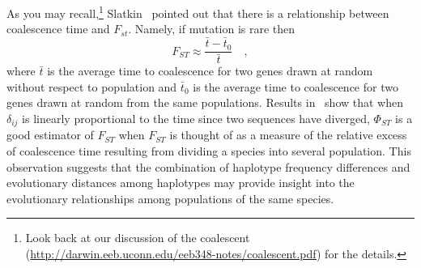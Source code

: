 \documentclass[12pt]{article}
\begin{document}
As you may recall,\footnote{Look back at our discussion of the
  coalescent
  (\url{http://darwin.eeb.uconn.edu/eeb348-notes/coalescent.pdf}) for
  the details.}  Slatkin~\cite{Slatkin91-coalescence} pointed out that
there is a relationship between coalescence time and $F_{st}$. Namely,
if mutation is rare then
\[
F_{ST} \approx \frac{\bar t - \bar t_0}{\bar t} \quad ,
\]
where $\bar t$ is the average time to coalescence for two genes drawn
at random without respect to population and $\bar t_0$ is the average
time to coalescence for two genes drawn at random from the same
populations. Results in~\cite{Holsinger-MasonGamer96} show that when
$\delta_{ij}$ is linearly proportional to the time since two sequences
have diverged, $\Phi_{ST}$ is a good estimator of $F_{ST}$ when
$F_{ST}$ is thought of as a measure of the relative excess of
coalescence time resulting from dividing a species into several
population. This observation suggests that the combination of
haplotype frequency differences and evolutionary distances among
haplotypes may provide insight into the evolutionary relationships
among populations of the same species.




\ccLicense
\end{document}
